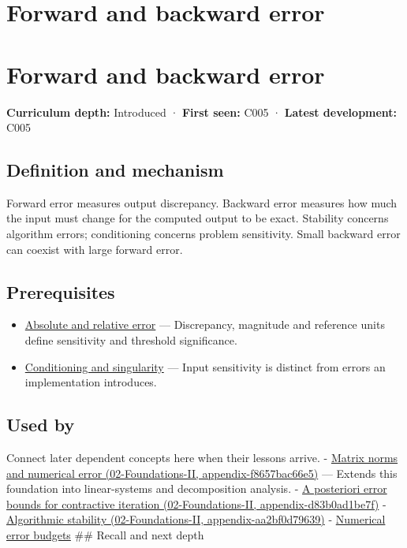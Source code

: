 \hypertarget{appendix-a7fbaf6d1b1c}{}
\section*{Forward and backward error}
\section{Forward and backward error}\label{forward-and-backward-error}

\textbf{Curriculum depth:} Introduced · \textbf{First seen:} C005 · \textbf{Latest development:} C005

\subsection{Definition and mechanism}\label{definition-and-mechanism}

Forward error measures output discrepancy. Backward error measures how much the input must change for the computed output to be exact. Stability concerns algorithm errors; conditioning concerns problem sensitivity. Small backward error can coexist with large forward error.

\subsection{Prerequisites}\label{prerequisites}

\begin{itemize}
\tightlist
\item
  \hyperref[appendix-3ae74e89b4e6]{Absolute and relative error} --- Discrepancy, magnitude and reference units define sensitivity and threshold significance.
\item
  \hyperref[appendix-8f6a01f284a7]{Conditioning and singularity} --- Input sensitivity is distinct from errors an implementation introduces.
\end{itemize}

\subsection{Used by}\label{used-by}

Connect later dependent concepts here when their lessons arrive. - \href{}{Matrix norms and numerical error (02-Foundations-II, appendix-f8657bac66e5)} --- Extends this foundation into linear-systems and decomposition analysis. - \href{}{A posteriori error bounds for contractive iteration (02-Foundations-II, appendix-d83b0ad1be7f)} - \href{}{Algorithmic stability (02-Foundations-II, appendix-aa2bf0d79639)} - \hyperref[appendix-31b8c295e05f]{Numerical error budgets} \#\# Recall and next depth

